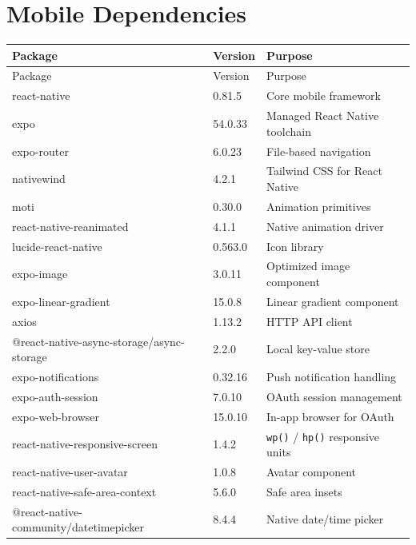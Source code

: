 \documentclass[12pt,a4paper]{report}
\begin{document}
\section{Mobile Dependencies}

\begin{longtable}{>{\ttfamily}l l p{7cm}}
\rowcolor{tableheadbg}
\color{white}\normalfont Package & \color{white}Version & \color{white}Purpose \\
\endfirsthead
\rowcolor{tableheadbg}
\color{white}\normalfont Package & \color{white}Version & \color{white}Purpose \\
\endhead
\toprule
\rowcolor{rowodd}  react-native              & 0.81.5   & Core mobile framework \\
\rowcolor{roweven} expo                      & 54.0.33  & Managed React Native toolchain \\
\rowcolor{rowodd}  expo-router               & 6.0.23   & File-based navigation \\
\rowcolor{roweven} nativewind                & 4.2.1    & Tailwind CSS for React Native \\
\rowcolor{rowodd}  moti                      & 0.30.0   & Animation primitives \\
\rowcolor{roweven} react-native-reanimated   & 4.1.1    & Native animation driver \\
\rowcolor{rowodd}  lucide-react-native       & 0.563.0  & Icon library \\
\rowcolor{roweven} expo-image                & 3.0.11   & Optimized image component \\
\rowcolor{rowodd}  expo-linear-gradient      & 15.0.8   & Linear gradient component \\
\rowcolor{roweven} axios                     & 1.13.2   & HTTP API client \\
\rowcolor{rowodd}  @react-native-async-storage/async-storage & 2.2.0 & Local key-value store \\
\rowcolor{roweven} expo-notifications        & 0.32.16  & Push notification handling \\
\rowcolor{rowodd}  expo-auth-session         & 7.0.10   & OAuth session management \\
\rowcolor{roweven} expo-web-browser          & 15.0.10  & In-app browser for OAuth \\
\rowcolor{rowodd}  react-native-responsive-screen & 1.4.2 & \texttt{wp()} / \texttt{hp()} responsive units \\
\rowcolor{roweven} react-native-user-avatar  & 1.0.8    & Avatar component \\
\rowcolor{rowodd}  react-native-safe-area-context & 5.6.0 & Safe area insets \\
\rowcolor{roweven} @react-native-community/datetimepicker & 8.4.4 & Native date/time picker \\
\bottomrule
\end{longtable}
\end{document}
